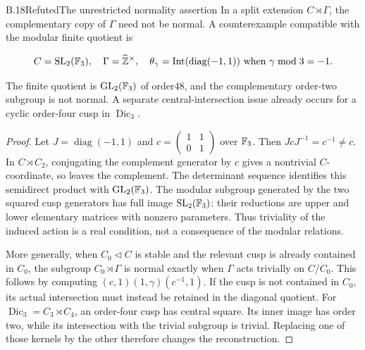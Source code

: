 \begin{statement}{B.18}{Refuted}{The unrestricted normality assertion}
In a split extension $C\rtimes\Gamma$, the complementary
copy of $\Gamma$ need not be normal.
A counterexample compatible with the modular finite quotient
is

$$
C=\operatorname{SL}_2(\mathbb F_3),\quad
 \Gamma=\widehat{\mathbb Z}^\times,\quad
 \theta_\gamma=\operatorname{Int}(\operatorname{diag}(-1,1))
       \text{ when }\gamma\bmod3=-1.
$$

The finite quotient is $\operatorname{GL}_2(\mathbb F_3)$ of order48,
and the complementary order-two subgroup is not normal.
A separate central-intersection issue already occurs for
a cyclic order-four cusp in $\operatorname{Dic}_3$.
\end{statement}
\begin{proof}
Let $J=\operatorname{diag}(-1,1)$ and
$c=\left(\begin{smallmatrix}1&1\\0&1\end{smallmatrix}\right)$
over $\mathbb F_3$. Then $JcJ^{-1}=c^{-1}\ne c$.
In $C\rtimes C_2$, conjugating the complement generator by
$c$ gives a nontrivial $C$-coordinate, so leaves the complement.
The determinant sequence identifies this semidirect product
with $\operatorname{GL}_2(\mathbb F_3)$.
The modular subgroup generated by the two squared cusp
generators has full image $\operatorname{SL}_2(\mathbb F_3)$: their reductions
are upper and lower elementary matrices with nonzero
parameters. Thus triviality of the induced action is a real
condition, not a consequence of the modular relations.

More generally, when $C_0\triangleleft C$ is stable and the
relevant cusp is already contained in $C_0$, the subgroup
$C_0\rtimes\Gamma$ is normal exactly when $\Gamma$ acts
trivially on $C/C_0$. This follows by computing
$(c,1)(1,\gamma)(c^{-1},1)$.
If the cusp is not contained in $C_0$, its actual intersection
must instead be retained in the diagonal quotient.
For $\operatorname{Dic}_3=C_3\rtimes C_4$, an order-four
cusp has central square. Its inner image has order two,
while its intersection with the trivial subgroup is trivial.
Replacing one of those kernels by the other therefore
changes the reconstruction.
\end{proof}

